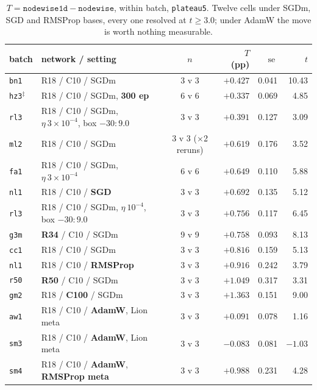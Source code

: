 \documentclass[10pt,letterpaper]{article}
\newcommand{\Tstat}{T}                         %
\newcommand{\plateau}{\texttt{plateau5}}
\newcommand{\arm}[1]{\texttt{#1}}
\DeclareMathOperator{\se}{se}
\begin{document}
\begin{table}[htbp]
\centering
\small
\caption{$\Tstat = \arm{nodewise1d} - \arm{nodewise}$, within batch, \plateau. Twelve cells under
SGDm, SGD and RMSProp bases, every one resolved at $t \ge 3.0$; under AdamW the move is worth
nothing measurable.}
\label{tab:T}
\begin{tabular}{@{}llcrrr@{}}
\toprule
batch & network / setting & $n$ & $\Tstat$ (pp) & $\se$ & $t$ \\
\midrule
\arm{bn1} & R18 / C10 / SGDm & 3 v 3 & $+0.427$ & 0.041 & 10.43 \\
\arm{hz3}$^{\ddagger}$ & R18 / C10 / SGDm, \textbf{300 ep} & 6 v 6 & $+0.337$ & 0.069 & 4.85 \\
\arm{rl3} & R18 / C10 / SGDm, $\eta\ 3{\times}10^{-4}$, box $-30{:}9.0$ & 3 v 3 & $+0.391$ & 0.127 & 3.09 \\
\arm{ml2} & R18 / C10 / SGDm & 3 v 3 ($\times$2 reruns) & $+0.619$ & 0.176 & 3.52 \\
\arm{fa1} & R18 / C10 / SGDm, $\eta\ 3{\times}10^{-4}$ & 6 v 6 & $+0.649$ & 0.110 & 5.88 \\
\arm{nl1} & R18 / C10 / \textbf{SGD} & 3 v 3 & $+0.692$ & 0.135 & 5.12 \\
\arm{rl3} & R18 / C10 / SGDm, $\eta\ 10^{-4}$, box $-30{:}9.0$ & 3 v 3 & $+0.756$ & 0.117 & 6.45 \\
\arm{g3m} & \textbf{R34} / C10 / SGDm & 9 v 9 & $+0.758$ & 0.093 & 8.13 \\
\arm{cc1} & R18 / C10 / SGDm & 3 v 3 & $+0.816$ & 0.159 & 5.13 \\
\arm{nl1} & R18 / C10 / \textbf{RMSProp} & 3 v 3 & $+0.916$ & 0.242 & 3.79 \\
\arm{r50} & \textbf{R50} / C10 / SGDm & 3 v 3 & $+1.049$ & 0.317 & 3.31 \\
\arm{gm2} & R18 / \textbf{C100} / SGDm & 3 v 3 & $+1.363$ & 0.151 & 9.00 \\
\midrule
\arm{aw1} & R18 / C10 / \textbf{AdamW}, Lion meta & 3 v 3 & $\mathbf{+0.091}$ & 0.078 & 1.16 \\
\arm{sm3} & R18 / C10 / \textbf{AdamW}, Lion meta & 3 v 3 & $\mathbf{-0.083}$ & 0.081 & $-1.03$ \\
\arm{sm4} & R18 / C10 / \textbf{AdamW}, \textbf{RMSProp meta} & 3 v 3 & $\mathbf{+0.988}$ &
  0.231 & 4.28 \\
\bottomrule
\end{tabular}


\end{table}
\end{document}
